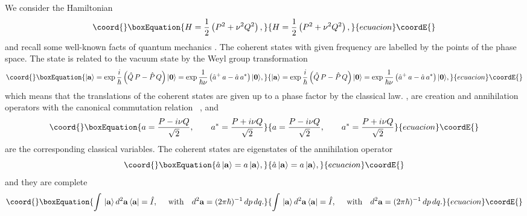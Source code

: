 \documentclass[a4paper,12pt]{article}
\begin{document}
We consider the Hamiltonian
\begin{equation}\coord{}\boxEquation{\label{Hamilton1}
H=\frac{1}{2}\left(P^2 + \nu^2 Q^2 \right),
}{H=\frac{1}{2}\left(P^2 + \nu^2 Q^2 \right),
}{ecuacion}\coordE{}\end{equation}
and recall some well-known facts of quantum mechanics
\cite{Perelomov}.  The coherent states \coordHE{} with given frequency \coordHE{} are labelled by the points
of the phase space.  The state \coordHE{} is related to the
vacuum state \coordHE{} by the Weyl group transformation
\begin{equation}\coord{}\boxEquation{\label{Weilgroup}
|{\bf a}\rangle =
\exp\frac{i}{\hbar}\left(\hat Q\, P-\hat P\,Q\right)
 |{\bf {0}}\rangle =
\exp\frac{1}{\hbar\nu}\left(\hat a^+\, a-\hat a\,a^*\right)
 |{\bf {0}}\rangle,
}{|{\bf a}\rangle =
\exp\frac{i}{\hbar}\left(\hat Q\, P-\hat P\,Q\right)
 |{\bf {0}}\rangle =
\exp\frac{1}{\hbar\nu}\left(\hat a^+\, a-\hat a\,a^*\right)
 |{\bf {0}}\rangle,
}{ecuacion}\coordE{}\end{equation}
which means that the translations of the coherent states
 are given up to a phase factor by the classical law.
\coordHE{}, \coordHE{} are creation and annihilation
operators  with the canonical commutation relation \,
\coordHE{}, and
\begin{equation}\coord{}\boxEquation{\label{a,a+}
a=\frac{P-i\nu Q}{\sqrt{2}},~~~~~~
a^*=\frac{P+i\nu Q}{\sqrt{2}}
}{a=\frac{P-i\nu Q}{\sqrt{2}},~~~~~~
a^*=\frac{P+i\nu Q}{\sqrt{2}}
}{ecuacion}\coordE{}\end{equation}
are the corresponding classical variables.
The coherent states are eigenstates of the annihilation operator
\begin{equation}\coord{}\boxEquation{\label{eigenstate}
\hat a\,|{\bf a}\rangle = a\,|{\bf a}\rangle,
}{\hat a\,|{\bf a}\rangle = a\,|{\bf a}\rangle,
}{ecuacion}\coordE{}\end{equation}
and they are complete
\begin{equation}\coord{}\boxEquation{\label{I}
\int\, |{\bf a}\rangle\, d^2{\bf a}\, \langle{\bf a}|=\hat I,~~~~
\mbox{with}~~~d^2{\bf a}=(2\pi\hbar)^{-1}\,dp\,dq.
}{\int\, |{\bf a}\rangle\, d^2{\bf a}\, \langle{\bf a}|=\hat I,~~~~
\mbox{with}~~~d^2{\bf a}=(2\pi\hbar)^{-1}\,dp\,dq.
}{ecuacion}\coordE{}\end{equation}
\end{document}

